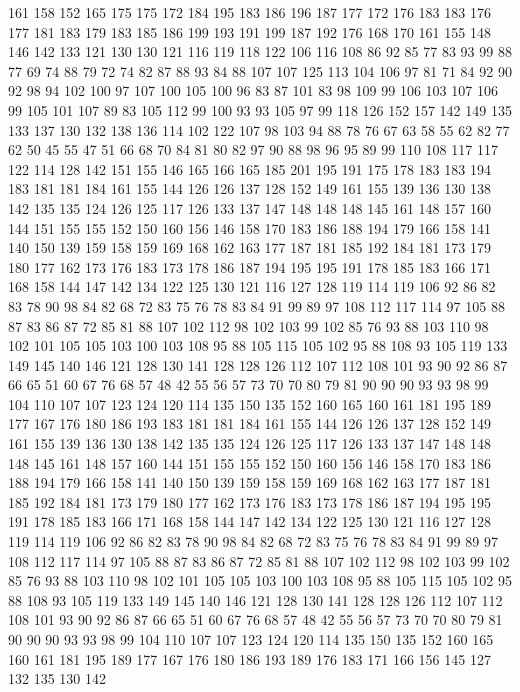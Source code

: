 161 158 152 165 175 175 172 184 195 183 186 196 187 177 172 176 183 183 176 177
181 183 179 183 185 186 199 193 191 199 187 192 176 168 170 161 155 148 146 142
133 121 130 130 121 116 119 118 122 106 116 108 86 92 85 77 83 93 99 88
77 69 74 88 79 72 74 82 87 88 93 84 88 107 107 125 113 104 106 97
81 71 84 92 90 92 98 94 102 100 97 107 100 105 100 96 83 87 101 83
98 109 99 106 103 107 106 99 105 101 107 89 83 105 112 99 100 93 93 105
97 99 118 126 152 157 142 149 135 133 137 130 132 138 136 114 102 122 107 98
103 94 88 78 76 67 63 58 55 62 82 77 62 50 45 55 47 51 66 68
70 84 81 80 82 97 90 88 98 96 95 89 99 110 108 117 117 122 114 128
142 151 155 146 165 166 165 185 201 195 191 175 178 183 183 194 183 181 181 184
161 155 144 126 126 137 128 152 149 161 155 139 136 130 138 142 135 135 124 126
125 117 126 133 137 147 148 148 148 145 161 148 157 160 144 151 155 155 152 150
160 156 146 158 170 183 186 188 194 179 166 158 141 140 150 139 159 158 159 169
168 162 163 177 187 181 185 192 184 181 173 179 180 177 162 173 176 183 173 178
186 187 194 195 195 191 178 185 183 166 171 168 158 144 147 142 134 122 125 130
121 116 127 128 119 114 119 106 92 86 82 83 78 90 98 84 82 68 72 83
75 76 78 83 84 91 99 89 97 108 112 117 114 97 105 88 87 83 86 87
72 85 81 88 107 102 112 98 102 103 99 102 85 76 93 88 103 110 98 102
101 105 105 103 100 103 108 95 88 105 115 105 102 95 88 108 93 105 119 133
149 145 140 146 121 128 130 141 128 128 126 112 107 112 108 101 93 90 92 86
87 66 65 51 60 67 76 68 57 48 42 55 56 57 73 70 70 80 79 81
90 90 90 93 93 98 99 104 110 107 107 123 124 120 114 135 150 135 152 160
165 160 161 181 195 189 177 167 176 180 186 193 183 181 181 184 161 155 144 126
126 137 128 152 149 161 155 139 136 130 138 142 135 135 124 126 125 117 126 133
137 147 148 148 148 145 161 148 157 160 144 151 155 155 152 150 160 156 146 158
170 183 186 188 194 179 166 158 141 140 150 139 159 158 159 169 168 162 163 177
187 181 185 192 184 181 173 179 180 177 162 173 176 183 173 178 186 187 194 195
195 191 178 185 183 166 171 168 158 144 147 142 134 122 125 130 121 116 127 128
119 114 119 106 92 86 82 83 78 90 98 84 82 68 72 83 75 76 78 83
84 91 99 89 97 108 112 117 114 97 105 88 87 83 86 87 72 85 81 88
107 102 112 98 102 103 99 102 85 76 93 88 103 110 98 102 101 105 105 103
100 103 108 95 88 105 115 105 102 95 88 108 93 105 119 133 149 145 140 146
121 128 130 141 128 128 126 112 107 112 108 101 93 90 92 86 87 66 65 51
60 67 76 68 57 48 42 55 56 57 73 70 70 80 79 81 90 90 90 93
93 98 99 104 110 107 107 123 124 120 114 135 150 135 152 160 165 160 161 181
195 189 177 167 176 180 186 193 189 176 183 171 166 156 145 127 132 135 130 142
